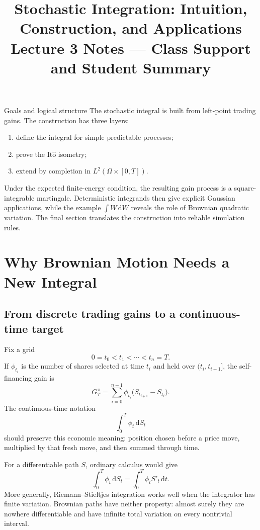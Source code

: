 \documentclass[10pt]{article}
\title{\textbf{Stochastic Integration: Intuition, Construction, and Applications}\\
\large Lecture 3 Notes --- Class Support and Student Summary}
\author{}
\date{}
\newcommand{\1}{\mathbf 1}
\newcommand{\dd}{\,\mathrm d}
\newcommand{\Ito}{\mathrm{It\hat{o}}}
\theoremstyle{definition}
\begin{document}
\maketitle
\vspace{-1.4em}

\begin{keyidea}{Goals and logical structure}
The stochastic integral is built from left-point trading gains. The construction
has three layers:
\begin{enumerate}
  \item define the integral for simple predictable processes;
  \item prove the \(\Ito\) isometry;
  \item extend by completion in \(L^2(\Omega\times[0,T])\).
\end{enumerate}
Under the expected finite-energy condition, the resulting gain process is a
square-integrable martingale. Deterministic integrands then give explicit
Gaussian applications, while the example \(\int W\dd W\) reveals the role of
Brownian quadratic variation. The final section translates the construction
into reliable simulation rules.
\end{keyidea}

\section{Why Brownian Motion Needs a New Integral}

\subsection{From discrete trading gains to a continuous-time target}

Fix a grid
\[
0=t_0<t_1<\cdots<t_n=T.
\]
If \(\phi_{t_i}\) is the number of shares selected at time \(t_i\) and held
over \((t_i,t_{i+1}]\), the self-financing gain is
\[
G_T^\pi=\sum_{i=0}^{n-1}\phi_{t_i}
\bigl(S_{t_{i+1}}-S_{t_i}\bigr).
\]
The continuous-time notation
\[
\int_0^T\phi_t\dd S_t
\]
should preserve this economic meaning: position chosen before a price move,
multiplied by that fresh move, and then summed through time.

For a differentiable path \(S\), ordinary calculus would give
\[
\int_0^T\phi_t\dd S_t=\int_0^T\phi_tS'_t\dd t.
\]
More generally, Riemann--Stieltjes integration works well when the integrator
has finite variation. Brownian paths have neither property: almost surely they
are nowhere differentiable and have infinite total variation on every
nontrivial interval.
\end{document}
